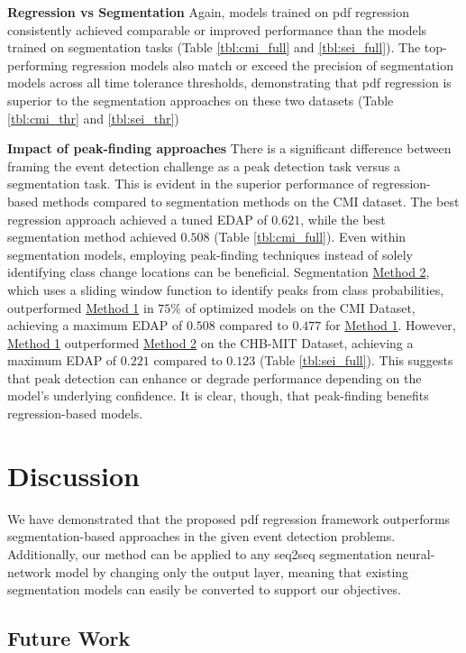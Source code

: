\documentclass{article}
\begin{document}
\textbf{Regression vs Segmentation} Again, models trained on pdf regression consistently achieved comparable or improved performance than the models trained on segmentation tasks (Table \ref{tbl:cmi_full} and \ref{tbl:sei_full}). The top-performing regression models also match or exceed the precision of segmentation models across all time tolerance thresholds, demonstrating that pdf regression is superior to the segmentation approaches on these two datasets (Table \ref{tbl:cmi_thr} and \ref{tbl:sei_thr})

\textbf{Impact of peak-finding approaches} There is a significant difference between framing the event detection challenge as a peak detection task versus a segmentation task. This is evident in the superior performance of regression-based methods compared to segmentation methods on the CMI dataset. The best regression approach achieved a tuned EDAP of $0.621$, while the best segmentation method achieved $0.508$ (Table \ref{tbl:cmi_full}). Even within segmentation models, employing peak-finding techniques instead of solely identifying class change locations can be beneficial. Segmentation \hyperref[seg:m2]{Method 2}, which uses a sliding window function to identify peaks from class probabilities, outperformed \hyperref[seg:m1]{Method 1} in $75\%$ of optimized models on the CMI Dataset, achieving a maximum EDAP of $0.508$ compared to $0.477$ for \hyperref[seg:m1]{Method 1}. However, \hyperref[seg:m1]{Method 1} outperformed \hyperref[seg:m2]{Method 2} on the CHB-MIT Dataset, achieving a maximum EDAP of $0.221$ compared to $0.123$ (Table \ref{tbl:sei_full}). This suggests that peak detection can enhance or degrade performance depending on the model's underlying confidence. It is clear, though, that peak-finding benefits regression-based models.

\section{Discussion}
\label{section:discussion}

We have demonstrated that the proposed pdf regression framework outperforms segmentation-based approaches in the given event detection problems. Additionally, our method can be applied to any seq2seq segmentation neural-network model by changing only the output layer, meaning that existing segmentation models can easily be converted to support our objectives.

\subsection{Future Work}
\end{document}
